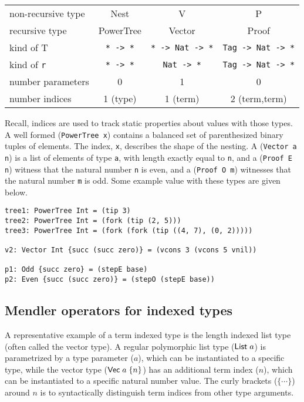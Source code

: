 \vspace*{0.1in}
\begin{tabular}{l|c|c|c}
non-recursive type & Nest          & V                    & P                       \\
recursive type     & PowerTree     & Vector               & Proof                   \\ \hline
kind of T          & \verb+* -> *+ & \verb+* -> Nat -> *+ & \verb+Tag -> Nat -> *+  \\ 
kind of \verb+r+   &  \verb+* -> *+ & \verb+Nat -> *+     & \verb+Tag -> Nat -> *+  \\
number parameters  & 0             & 1                    & 0                       \\ 
number indices     & 1 (type)      & 1 (term)             & 2 (term,term)           \\ 

\end{tabular}

\vspace*{0.1in}
Recall, indices are used to track static properties about values
with those types. A well formed (\verb+PowerTree x+) contains a balanced
set of parenthesized binary tuples of elements. The index, \verb+x+,  describes
the shape of the nesting. A (\verb+Vector a n+) is a list of elements of
type \verb+a+, with length exactly equal to \verb+n+, and a (\verb+Proof E n+) witness that
the natural number \verb+n+ is even, and a (\verb+Proof O m+) witnesses
that the natural number \verb+m+ is odd. Some example value with these types are
given below.

{\small
\begin{verbatim}
tree1: PowerTree Int = (tip 3)
tree2: PowerTree Int = (fork (tip (2, 5)))
tree3: PowerTree Int = (fork (fork (tip ((4, 7), (0, 2)))))

v2: Vector Int {succ (succ zero)} = (vcons 3 (vcons 5 vnil))

p1: Odd {succ zero} = (stepE base)
p2: Even {succ (succ zero)} = (stepO (stepE base))
\end{verbatim}}

 


\subsection{Mendler operators for indexed types}

A representative example of a term
indexed type is the length indexed list type (often called the vector type).
A regular polymorphic list type ($\mathsf{List}\;a$) is parametrized by a type
parameter ($a$), which can be instantiated to a specific type, while the
vector type ($\mathsf{Vec}\;a\;\{n\}$) has an additional term index ($n$), which
can be instantiated to a specific natural number value. The curly brackets
($\{\cdots\}$) around $n$ is to syntactically distinguish term indices from
other type arguments. 

